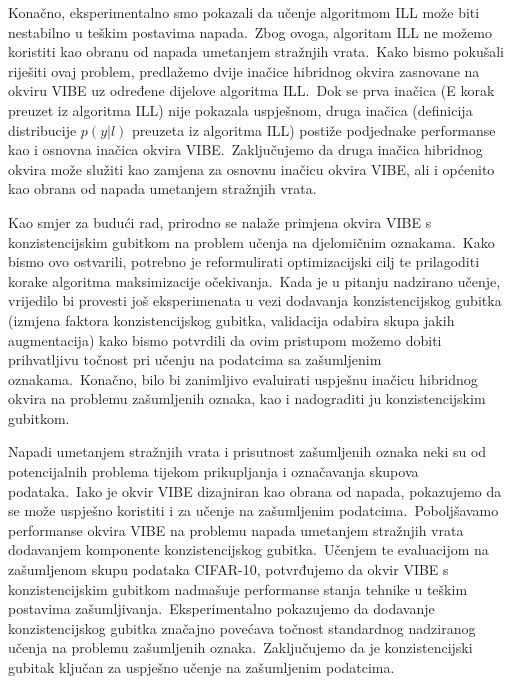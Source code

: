 \documentclass[diplomskirad]{fer}
\begin{document}
Konačno, eksperimentalno smo pokazali da učenje algoritmom ILL može biti nestabilno u teškim postavima napada.\ Zbog ovoga, algoritam ILL ne možemo koristiti kao obranu od napada umetanjem stražnjih vrata.\ 
Kako bismo pokušali riješiti ovaj problem, predlažemo dvije inačice hibridnog okvira zasnovane na okviru VIBE uz određene dijelove algoritma ILL.\ 
Dok se prva inačica (E korak preuzet iz algoritma ILL) nije pokazala uspješnom, druga inačica (definicija distribucije $p(y | l)$ preuzeta iz algoritma ILL) postiže podjednake performanse kao i osnovna inačica okvira VIBE.\ 
Zaključujemo da druga inačica hibridnog okvira može služiti kao zamjena za osnovnu inačicu okvira VIBE, ali i općenito kao obrana od napada umetanjem stražnjih vrata.\ 

Kao smjer za budući rad, prirodno se nalaže primjena okvira VIBE s konzistencijskim gubitkom na problem učenja na djelomičnim oznakama.\ 
Kako bismo ovo ostvarili, potrebno je reformulirati optimizacijski cilj te prilagoditi korake algoritma maksimizacije očekivanja.\ 
Kada je u pitanju nadzirano učenje, vrijedilo bi provesti još eksperimenata u vezi dodavanja konzistencijskog gubitka (izmjena faktora konzistencijskog gubitka, validacija odabira skupa jakih augmentacija) kako bismo potvrdili da ovim pristupom možemo dobiti prihvatljivu točnost pri učenju na podatcima sa zašumljenim oznakama.\ 
Konačno, bilo bi zanimljivo evaluirati uspješnu inačicu hibridnog okvira na problemu zašumljenih oznaka, kao i nadograditi ju konzistencijskim gubitkom.\ 






\begin{sazetak}
  Napadi umetanjem stražnjih vrata i prisutnost zašumljenih oznaka neki su od potencijalnih problema tijekom prikupljanja i označavanja skupova podataka.\ 
  Iako je okvir VIBE dizajniran kao obrana od napada, pokazujemo da se može uspješno koristiti i za učenje na zašumljenim podatcima.\ 
  Poboljšavamo performanse okvira VIBE na problemu napada umetanjem stražnjih vrata dodavanjem komponente konzistencijskog gubitka.\ 
  Učenjem te evaluacijom na zašumljenom skupu podataka CIFAR-10, potvrđujemo da okvir VIBE s konzistencijskim gubitkom nadmašuje performanse stanja tehnike u teškim postavima zašumljivanja.\ 
  Eksperimentalno pokazujemo da dodavanje konzistencijskog gubitka značajno povećava točnost standardnog nadziranog učenja na problemu zašumljenih oznaka.\ 
  Zaključujemo da je konzistencijski gubitak ključan za uspješno učenje na zašumljenim podatcima.\ 
\end{sazetak}
\end{document}
